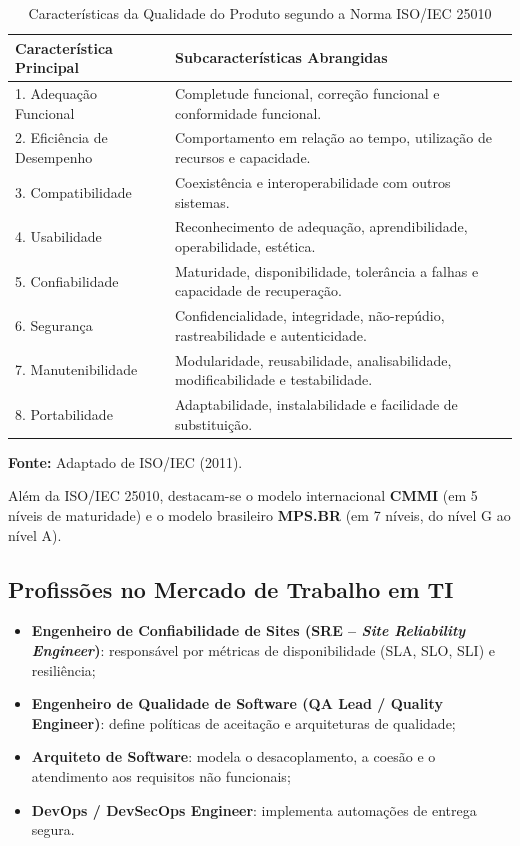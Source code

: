 \documentclass[12pt,a4paper]{article}
\begin{document}
\begin{table}[H]
\centering
\caption{Características da Qualidade do Produto segundo a Norma ISO/IEC 25010}
\label{tab:iso25010}
\small
\begin{tabularx}{\textwidth}{p{4.2cm}X}
\toprule
\textbf{Característica Principal} & \textbf{Subcaracterísticas Abrangidas} \\
\midrule
1. Adequação Funcional & Completude funcional, correção funcional e conformidade funcional. \\
2. Eficiência de Desempenho & Comportamento em relação ao tempo, utilização de recursos e capacidade. \\
3. Compatibilidade & Coexistência e interoperabilidade com outros sistemas. \\
4. Usabilidade & Reconhecimento de adequação, aprendibilidade, operabilidade, estética. \\
5. Confiabilidade & Maturidade, disponibilidade, tolerância a falhas e capacidade de recuperação. \\
6. Segurança & Confidencialidade, integridade, não-repúdio, rastreabilidade e autenticidade. \\
7. Manutenibilidade & Modularidade, reusabilidade, analisabilidade, modificabilidade e testabilidade. \\
8. Portabilidade & Adaptabilidade, instalabilidade e facilidade de substituição. \\
\bottomrule
\end{tabularx}
\vspace{0.1cm}
{\footnotesize \textbf{Fonte:} Adaptado de ISO/IEC (2011).}
\end{table}

Além da ISO/IEC 25010, destacam-se o modelo internacional \textbf{CMMI} (em 5 níveis de maturidade) e o modelo brasileiro \textbf{MPS.BR} (em 7 níveis, do nível G ao nível A).

\subsection{Profissões no Mercado de Trabalho em TI}
\begin{itemize}
    \item \textbf{Engenheiro de Confiabilidade de Sites (SRE -- \textit{Site Reliability Engineer})}: responsável por métricas de disponibilidade (SLA, SLO, SLI) e resiliência;
    \item \textbf{Engenheiro de Qualidade de Software (QA Lead / Quality Engineer)}: define políticas de aceitação e arquiteturas de qualidade;
    \item \textbf{Arquiteto de Software}: modela o desacoplamento, a coesão e o atendimento aos requisitos não funcionais;
    \item \textbf{DevOps / DevSecOps Engineer}: implementa automações de entrega segura.
\end{itemize}
\end{document}

